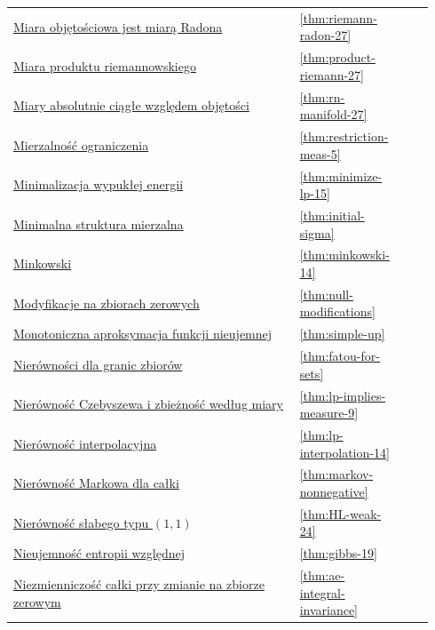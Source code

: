 \documentclass[11pt,a4paper,oneside]{book}
\numberwithin{equation}{chapter}
\theoremstyle{plain}
\theoremstyle{definition}
\theoremstyle{remark}
\begin{document}
\begin{longtable}{@{}p{0.72\linewidth}p{0.135\linewidth}p{0.08\linewidth}@{}}
\hyperref[thm:riemann-radon-27]{Miara objętościowa jest miarą Radona} & \ref*{thm:riemann-radon-27} & \pageref*{thm:riemann-radon-27} \\
\hyperref[thm:product-riemann-27]{Miara produktu riemannowskiego} & \ref*{thm:product-riemann-27} & \pageref*{thm:product-riemann-27} \\
\hyperref[thm:rn-manifold-27]{Miary absolutnie ciągłe względem objętości} & \ref*{thm:rn-manifold-27} & \pageref*{thm:rn-manifold-27} \\
\hyperref[thm:restriction-meas-5]{Mierzalność ograniczenia} & \ref*{thm:restriction-meas-5} & \pageref*{thm:restriction-meas-5} \\
\hyperref[thm:minimize-lp-15]{Minimalizacja wypukłej energii} & \ref*{thm:minimize-lp-15} & \pageref*{thm:minimize-lp-15} \\
\hyperref[thm:initial-sigma]{Minimalna struktura mierzalna} & \ref*{thm:initial-sigma} & \pageref*{thm:initial-sigma} \\
\hyperref[thm:minkowski-14]{Minkowski} & \ref*{thm:minkowski-14} & \pageref*{thm:minkowski-14} \\
\hyperref[thm:null-modifications]{Modyfikacje na zbiorach zerowych} & \ref*{thm:null-modifications} & \pageref*{thm:null-modifications} \\
\hyperref[thm:simple-up]{Monotoniczna aproksymacja funkcji nieujemnej} & \ref*{thm:simple-up} & \pageref*{thm:simple-up} \\
\hyperref[thm:fatou-for-sets]{Nierówności dla granic zbiorów} & \ref*{thm:fatou-for-sets} & \pageref*{thm:fatou-for-sets} \\
\hyperref[thm:lp-implies-measure-9]{Nierówność Czebyszewa i zbieżność według miary} & \ref*{thm:lp-implies-measure-9} & \pageref*{thm:lp-implies-measure-9} \\
\hyperref[thm:lp-interpolation-14]{Nierówność interpolacyjna} & \ref*{thm:lp-interpolation-14} & \pageref*{thm:lp-interpolation-14} \\
\hyperref[thm:markov-nonnegative]{Nierówność Markowa dla całki} & \ref*{thm:markov-nonnegative} & \pageref*{thm:markov-nonnegative} \\
\hyperref[thm:HL-weak-24]{Nierówność słabego typu $(1,1)$} & \ref*{thm:HL-weak-24} & \pageref*{thm:HL-weak-24} \\
\hyperref[thm:gibbs-19]{Nieujemność entropii względnej} & \ref*{thm:gibbs-19} & \pageref*{thm:gibbs-19} \\
\hyperref[thm:ae-integral-invariance]{Niezmienniczość całki przy zmianie na zbiorze zerowym} & \ref*{thm:ae-integral-invariance} & \pageref*{thm:ae-integral-invariance} \\

\end{longtable}
\end{document}
